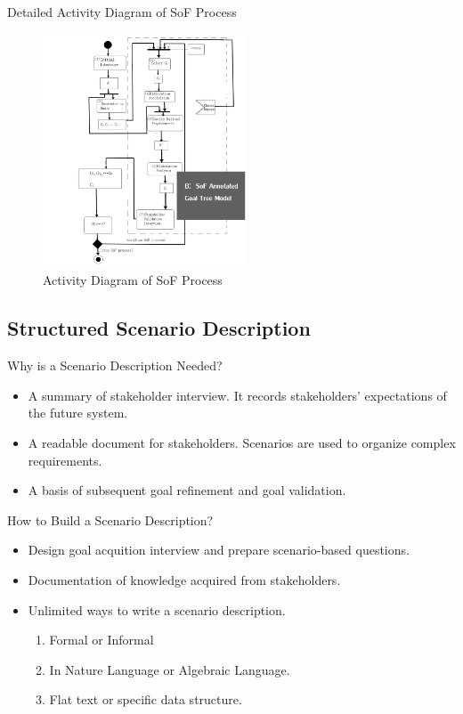 \documentclass{beamer}
\begin{document}
\begin{frame}{Detailed Activity Diagram of SoF Process}
  \begin{figure}
    \includegraphics[width=2.4in]{img/2_2.PNG}
    \caption{Activity Diagram of SoF Process}
  \end{figure}
\end{frame}  


\subsection{Structured Scenario Description}
\begin{frame}{Why is a Scenario Description Needed?}
  \begin{itemize}
  \item
    A summary of stakeholder interview.  It records stakeholders' expectations of the future system.
  \item
    A readable document for stakeholders.   Scenarios are used to organize complex requirements.  
  \item
    A basis of subsequent goal refinement and goal validation. 
  \end{itemize}
\end{frame}

\begin{frame}{How to Build a Scenario Description?}
  \begin{itemize}
  \item
    Design goal acquition interview and prepare scenario-based questions.
  \item
    Documentation of knowledge acquired from stakeholders.
  \item
    Unlimited ways to write a scenario description. 
    \begin{enumerate}
    \item Formal or Informal   
    \item In Nature Language or Algebraic Language.
    \item Flat text or specific data structure.
    \end{enumerate}
  \end{itemize}
\end{frame}
\end{document}
